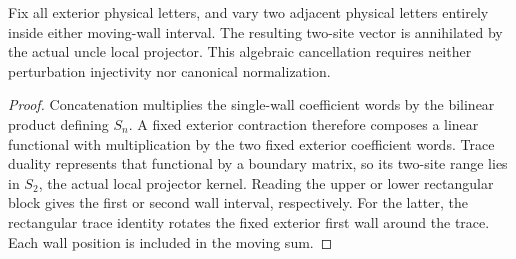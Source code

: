 \begin{lemma}
    \label{lem:uncle_two_wall_interior_cancellation}
    \leanok
    Fix all exterior physical letters, and vary two adjacent physical
    letters entirely inside either moving-wall interval. The resulting
    two-site vector is annihilated by the actual uncle local projector.
    This algebraic cancellation requires neither perturbation injectivity
    nor canonical normalization.
\end{lemma}
\begin{proof}\leanok
    Concatenation multiplies the single-wall coefficient words by the
    bilinear product defining $S_n$. A fixed exterior contraction therefore
    composes a linear functional with multiplication by the two fixed
    exterior coefficient words. Trace duality represents that functional
    by a boundary matrix, so its two-site range lies in $S_2$, the actual
    local projector kernel. Reading the upper or lower rectangular block
    gives the first or second wall interval, respectively. For the latter,
    the rectangular trace identity rotates the fixed exterior first wall
    around the trace. Each wall position is included in the moving sum.
\end{proof}

